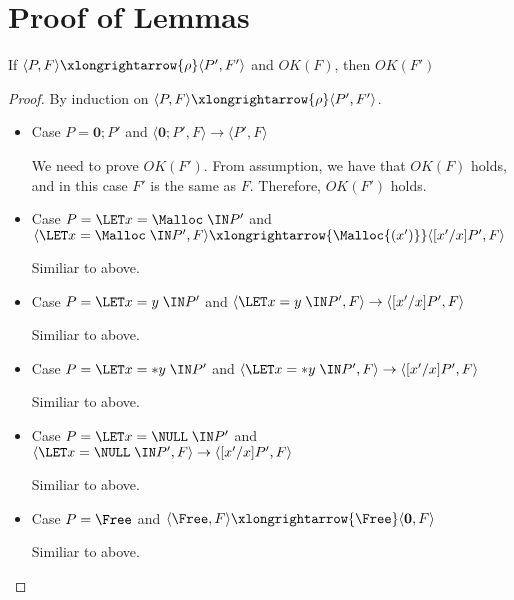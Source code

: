 \section{Proof of Lemmas}
\label{sec:proof}

\begin{lemma}
\label{lem:okFpreserved}
If \( \langle P, F \rangle \xlongrightarrow{\rho} \langle P', F' \rangle\) and \( OK(F)\), then \(OK(F')\)
\end{lemma}

\begin{proof}
By induction on \( \langle P, F \rangle \xlongrightarrow{\rho} \langle P', F' \rangle\).
  \begin{itemize}

  \item Case \( P = \mathbf{0};P'\) and \( \langle \mathbf{0};P', F \rangle \rightarrow \langle P', F \rangle \)
    
      We need to prove \(OK(F')\). From assumption, we have that
      \(OK(F)\) holds, and in this case \(F'\) is the same as
      \(F\). Therefore, \(OK(F')\) holds.

    \item Case \( P = \LET x = \Malloc \; \IN P'\) and \( \langle \LET
      x = \Malloc \; \IN P', F \rangle \xlongrightarrow{\Malloc{(x')}}
      \langle [x'/x]P', F \rangle \)

      Similiar to above.

    \item Case \( P = \LET x = y \; \IN P'\) and \( \langle \LET x = y
      \; \IN P', F \rangle \rightarrow \langle [x'/x]P', F \rangle \)

      Similiar to above.

    \item Case \( P = \LET x = *y \; \IN P'\) and \( \langle \LET x = *y
      \; \IN P', F \rangle \rightarrow \langle [x'/x]P', F \rangle \)

      Similiar to above.

    \item Case \( P = \LET x = \NULL \; \IN P'\) and \( \langle \LET x
      = \NULL \; \IN P', F \rangle \rightarrow \langle [x'/x]P', F
      \rangle \)

      Similiar to above.

    \item Case \( P = \Free\) and \( \langle \Free, F \rangle \xlongrightarrow{\Free} \langle \mathbf{0}, F \rangle \)

      Similiar to above.


\end{itemize}
\end{proof}
